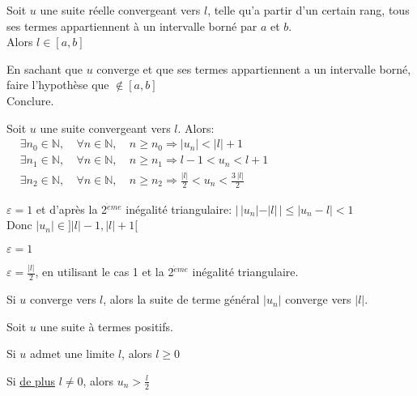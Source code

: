 \documentclass[12pt,twoside,a4paper]{article}
\begin{document}
			\begin{prop}
				Soit $u$ une suite r\'eelle convergeant vers $l$, telle qu'a partir d'un certain rang, tous ses termes appartiennent \`a un intervalle born\'e par $a$ et $b$.\\
				Alors $l\in[a,b]$
			\end{prop}
			\begin{preuve}
				En sachant que $u$ converge et que ses termes appartiennent a un intervalle born\'e, faire l'hypoth\`ese que $\notin[a,b]$\\
				Conclure.
			\end{preuve}
			\begin{prop}
				Soit $u$ une suite convergeant vers $l$. Alors:\\
				$\begin{aligned}
					&\exists n_0\in\mathbb{N},&\ \forall n\in\mathbb{N},&\ n\geqslant n_0\Rightarrow |u_n|<|l|+1\\
					&\exists n_1\in\mathbb{N},&\ \forall n\in\mathbb{N},&\ n\geqslant n_1\Rightarrow l-1<u_n<l+1\\
					&\exists n_2\in\mathbb{N},&\ \forall n\in\mathbb{N},&\ n\geqslant n_2\Rightarrow \frac{|l|}{2}<u_n<\frac{3\,|l|}{2}
				\end{aligned}$
			\end{prop}
			\begin{preuve}
				\begin{liste}
					\item $\varepsilon=1$ et d'apr\`es la 2$^{\grave{e}me}$ in\'egalit\'e triangulaire: $|\,|u_n|-|l|\,|\leqslant|u_n-l|<1$\\
						Donc $|u_n|\in]|l|-1,|l|+1[$
					\item $\varepsilon = 1$
					\item $\varepsilon = \frac{|l|}{2}$, en utilisant le cas 1 et la 2$^{\grave{e}me}$ in\'egalit\'e triangulaire.
				\end{liste}
			\end{preuve}
			\begin{prop}
				Si $u$ converge vers $l$, alors la suite de terme g\'en\'eral $|u_n|$ converge vers $|l|$.
			\end{prop}
			\begin{prop}
				Soit $u$ une suite \`a termes positifs.
				\begin{liste}
					\item Si $u$ admet une limite $l$, alors $l\geqslant0$
					\item Si \underline{de plus} $l\neq0$, alors $u_n>\frac{l}{2}$
				\end{liste}
			\end{prop}
\end{document}
